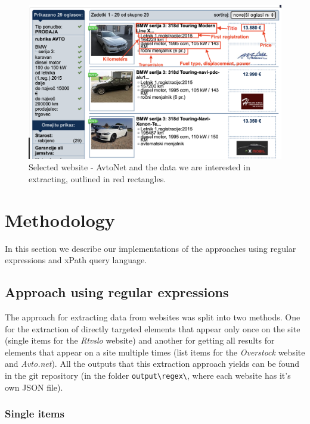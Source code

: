 \documentclass[9pt]{IEEEtran}
\begin{document}
\begin{figure}[h]
    \centering
    \includegraphics[width=1\columnwidth]{beemer.png}
    \caption{Selected website - AvtoNet and the data we are interested in extracting, outlined in red rectangles.}
    \label{fig:avtonet}
\end{figure}




\section{Methodology}
\label{section:methodology}

In this section we describe our implementations of the approaches using regular expressions and xPath query language.

\subsection{Approach using regular expressions}
\label{section:regex}

The approach for extracting data from websites was split into two methods. One for the extraction of directly targeted elements that appear only once on the site (single items for the \textit{Rtvslo} website) and another for getting all results for elements that appear on a site multiple times (list items for the \textit{Overstock} website and \textit{Avto.net}). All the outputs that this extraction approach yields can be found in the git repository (in the folder \verb/output\regex\/, where each website has it's own JSON file).

\subsubsection{Single items}
\end{document}
